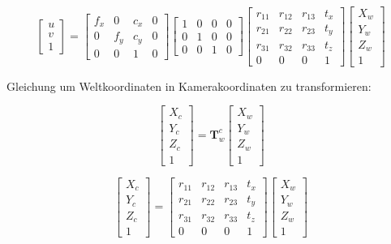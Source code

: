 \[
\begin{bmatrix}
u \\ 
v \\ 
1
\end{bmatrix}
=
\begin{bmatrix}
f_x & 0   & c_x & 0 \\ 
0   & f_y & c_y & 0 \\ 
0   & 0   & 1   & 0
\end{bmatrix}
\begin{bmatrix}
1 & 0 & 0 & 0 \\ 
0 & 1 & 0 & 0 \\ 
0 & 0 & 1 & 0
\end{bmatrix}
\begin{bmatrix}
r_{11} & r_{12} & r_{13} & t_x \\ 
r_{21} & r_{22} & r_{23} & t_y \\ 
r_{31} & r_{32} & r_{33} & t_z \\ 
0      & 0      & 0      & 1
\end{bmatrix}
\begin{bmatrix}
X_w \\ 
Y_w \\ 
Z_w \\ 
1
\end{bmatrix}
\]

Gleichung um Weltkoordinaten in Kamerakoordinaten zu transformieren:

\[
\begin{bmatrix}
X_c \\ 
Y_c \\ 
Z_c \\ 
1
\end{bmatrix}
=
\mathbf{T}^c_{w}
\begin{bmatrix}
X_w \\ 
Y_w \\ 
Z_w \\ 
1
\end{bmatrix}
\]

\[
\begin{bmatrix}
X_c \\ 
Y_c \\ 
Z_c \\ 
1
\end{bmatrix}
=
\begin{bmatrix}
r_{11} & r_{12} & r_{13} & t_x \\
r_{21} & r_{22} & r_{23} & t_y \\
r_{31} & r_{32} & r_{33} & t_z \\
0 & 0 & 0 & 1
\end{bmatrix}
\begin{bmatrix}
X_w \\ 
Y_w \\ 
Z_w \\ 
1
\end{bmatrix}
\]

